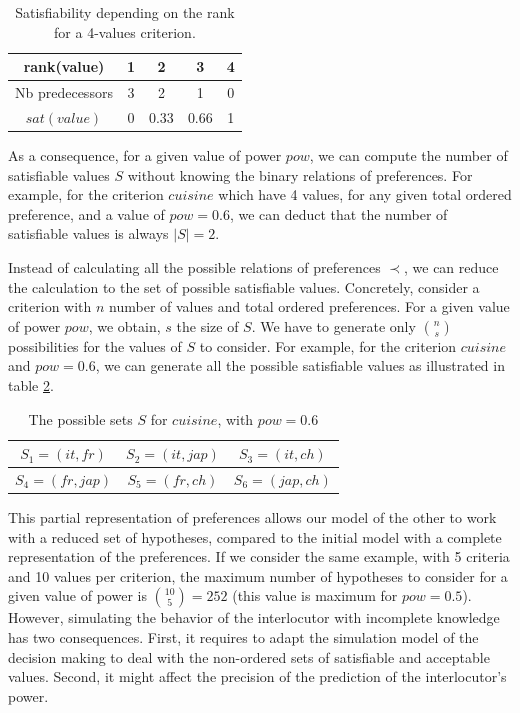 \documentclass[conference, letterpaper]{IEEEtran}
\begin{document}
	\begin{table}[h]
		\caption{Satisfiability depending on the rank for a 4-values criterion.}
		\label{tab:poss}
		\centering
		\large
		\begin{tabular}{ |c|c|c|c|c| }
			\hline				
			rank(value) & 1 & 2 & 3 & 4 \\
			\hline
			Nb predecessors & 3 & 2 & 1& 0 \\
			\hline
			$sat(value)$ & 0 & 0.33 & 0.66 &1 \\
			\hline
		\end{tabular}
	\end{table}
	
	As a consequence, for a given value of power $pow$, we can compute the number of satisfiable values $S$ without knowing the binary relations of preferences. For example, for the criterion $cuisine$ which have 4 values, for any given total ordered preference, and a value of $pow = 0.6$, we can deduct that the number of satisfiable values is always $|S| = 2$.
	
	Instead of calculating all the possible relations of preferences $\prec$, we can reduce the calculation to the set of possible satisfiable values.  Concretely, consider a criterion with $n$ number of values and total ordered preferences. For a given value of power $pow$, we obtain, $s$  the size of $S$. We have to generate only $\binom{n}{s}$ possibilities for the values of $S$ to consider. For example, for the criterion $cuisine$ and $pow =0.6$, we can generate all the possible satisfiable values as illustrated in table \ref{tab:sat_poss}.
		\begin{table}[h]
			\centering
			\caption{The possible sets $S$ for $cuisine$, with $pow=0.6$}
			\label{tab:sat_poss}
			\large
			\begin{tabular}{|c|c|c|}%
				\hline
				$S_1=(it,fr)$& $S_2=(it,jap)$ & $S_3=(it,ch)$\\
				\hline
				$S_4=(fr,jap)$ & $S_5=(fr,ch)$ & $S_6=(jap,ch)$ \\
				\hline
			\end{tabular}
		\end{table}
	
	This partial representation of preferences allows our model of the other to work with a reduced set of hypotheses, compared to the initial model with a complete representation of the preferences. If we consider the same example, with 5 criteria and 10 values per criterion, the maximum number of hypotheses to consider for a given value of power is $\binom{10}{5}=252$ (this value is maximum for $pow=0.5$).
 	However, simulating the behavior of the interlocutor with incomplete knowledge has two consequences. First, it requires to adapt the simulation model of the decision making to deal with the non-ordered sets of satisfiable and acceptable values. Second, it might affect the precision of the prediction of the interlocutor's power.
\end{document}

